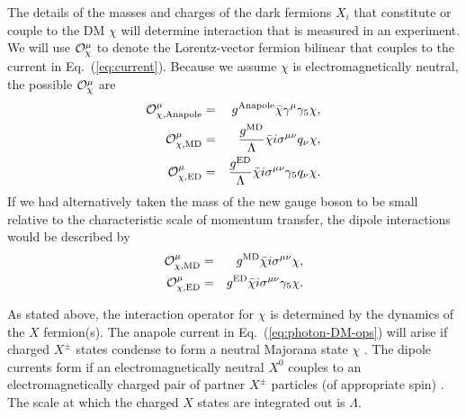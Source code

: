 \documentclass[11pt]{article}
\newcommand{\Eq}[1]{Eq.~(\ref{#1})} \newcommand{\Eqs}[2]{Eqs.~(\ref{#1}) and (\ref{#2})} \newcommand{\Eqm}[2]{Eqs.~(\ref{#1}) through (\ref{#2})}
\begin{document}
The details of the masses and charges of the dark fermions $X_i$ that constitute or couple to the DM $\chi$ will determine interaction that is measured in an experiment. We will use ${\cal O}_\chi^\mu$ to denote the Lorentz-vector fermion bilinear that couples to the current in \Eq{eq:current}. Because we assume $\chi$ is electromagnetically neutral, the possible ${\cal O}_\chi^\mu$ are \cite{Gresham:2014vja, Gluscevic:2015sqa}
\begin{eqnarray} \label{eq:photon-DM-ops}
{\cal O}_{\rm \chi, Anapole}^\mu & = & g^{\rm Anapole}\bar \chi \gamma^\mu \gamma_5 \chi, \\
{\cal O}_{\rm \chi, MD}^\mu & = & \frac{g^{\rm MD}}{\Lambda}\bar \chi i \sigma^{\mu \nu} q_\nu \chi ,\\
{\cal O}_{\rm \chi, ED}^\mu & = & \frac{g^{\rm ED}}{\Lambda} \bar \chi i \sigma^{\mu \nu} \gamma_5 q_\nu \chi.
\end{eqnarray}
If we had alternatively taken the mass of the new gauge boson to be small relative to the characteristic scale of momentum transfer, the dipole interactions would be described by
\begin{eqnarray} \label{eq:photon-DM-ops}
{\cal O}_{\rm \chi, MD}^\mu & = & g^{\rm MD}\bar \chi i \sigma^{\mu \nu}  \chi ,\\
{\cal O}_{\rm \chi, ED}^\mu & = & g^{\rm ED} \bar \chi i \sigma^{\mu \nu} \gamma_5 \chi.
\end{eqnarray}

As stated above, the interaction operator for $\chi$ is determined by the dynamics of the $X$ fermion(s). The anapole current in \Eq{eq:photon-DM-ops} will arise if charged $X^\pm$ states condense to form a neutral Majorana state $\chi$ \cite{Bagnasco:1993st}. The dipole currents form if an electromagnetically neutral $X^0$ couples to an electromagnetically charged pair of partner $X^\pm$ particles (of appropriate spin) \cite{Weiner:2012gm}. The scale at which the charged $X$ states are integrated out is $\Lambda$.
\end{document}
